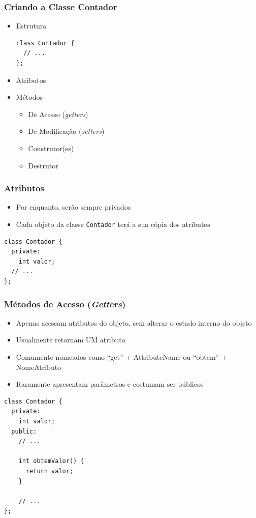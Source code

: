 \documentclass[aspectratio=169]{beamer}
\begin{document}
\begin{frame}[fragile]\frametitle{Criando a Classe Contador}
\begin{itemize}
	\item Estrutura
\begin{lstlisting}
class Contador {
  // ...
};
\end{lstlisting}
	\item Atributos
	\item Métodos
	\begin{itemize}
		\item De Acesso (\emph{getters})
		\item De Modificação (\emph{setters})
		\item Construtor(es)
		\item Destrutor
	\end{itemize}
\end{itemize}
\end{frame}

\begin{frame}[fragile]\frametitle{Atributos}
\begin{itemize}
	\item Por enquanto, serão sempre privados
	\item Cada objeto da classe \texttt{Contador} terá a sua cópia dos atributos
\end{itemize}
\begin{lstlisting}
class Contador {
  private:
    int valor;
  // ...
};
\end{lstlisting}
\end{frame}

\begin{frame}[fragile]\frametitle{Métodos de Acesso (\emph{Getters})}
\begin{itemize}
	\item Apenas acessam atributos do objeto, sem alterar o estado interno do objeto
	\item Usualmente retornam UM atributo
	\item Comumente nomeados como ``get'' + AttributeName ou ``obtem'' + NomeAtributo
	\item Raramente apresentam parâmetros e costumam ser públicos
\end{itemize}
\begin{lstlisting}[basicstyle=\ttfamily\scriptsize]
class Contador {
  private:
    int valor;
  public:
    // ...

    int obtemValor() {
      return valor;
    }

    // ...
};
\end{lstlisting}
\end{frame}
\end{document}
